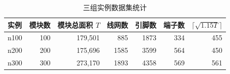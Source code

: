 \begin{table}[H]
\centering
\scriptsize
\caption{三组实例数据集统计}
\label{tab:dataset}
\begin{tabular}{lrrrrrr}
\toprule
实例 & 模块数 & 模块总面积 $T$ & 线网数 & 引脚数 & 端子数 & $\lceil\sqrt{1.15T}\rceil$ \\
\midrule
n100 & 100 & 179,501 & 885 & 1873 & 334 & 455 \\
n200 & 200 & 175,696 & 1585 & 3599 & 564 & 450 \\
n300 & 300 & 273,170 & 1893 & 4358 & 569 & 561 \\
\bottomrule
\end{tabular}
\end{table}
